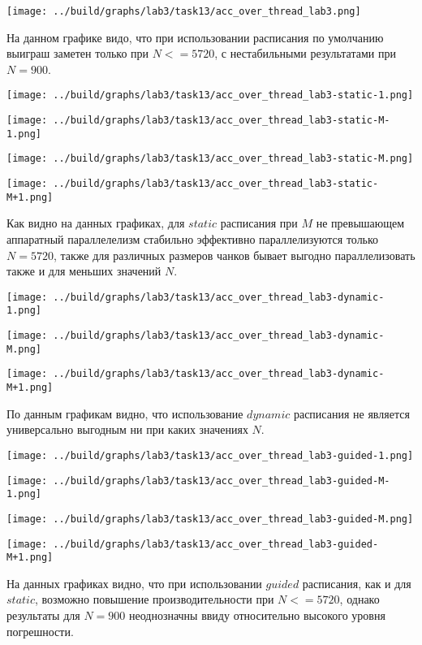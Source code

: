 \documentclass[14pt, a4paper, oneside, final]{extarticle}
\begin{document}
\texttt{[image: ../build/graphs/lab3/task13/acc\_over\_thread\_lab3.png]}

На данном графике видо, что при использовании расписания по умолчанию выиграш заметен только при $N<= 5720$, с нестабильными результатами при $N=900$.


\texttt{[image: ../build/graphs/lab3/task13/acc\_over\_thread\_lab3-static-1.png]}

\texttt{[image: ../build/graphs/lab3/task13/acc\_over\_thread\_lab3-static-M-1.png]}

\texttt{[image: ../build/graphs/lab3/task13/acc\_over\_thread\_lab3-static-M.png]}

\texttt{[image: ../build/graphs/lab3/task13/acc\_over\_thread\_lab3-static-M+1.png]}

Как видно на данных графиках, для $static$ расписания при $M$ не превышающем аппаратный параллелелизм стабильно эффективно параллелизуются только $N=5720$, также для различных размеров чанков бывает выгодно параллелизовать также и для меньших значений $N$.


\texttt{[image: ../build/graphs/lab3/task13/acc\_over\_thread\_lab3-dynamic-1.png]}

\texttt{[image: ../build/graphs/lab3/task13/acc\_over\_thread\_lab3-dynamic-M.png]}

\texttt{[image: ../build/graphs/lab3/task13/acc\_over\_thread\_lab3-dynamic-M+1.png]}

По данным графикам видно, что использование $dynamic$ расписания не является универсально выгодным ни при каких значениях $N$.

\texttt{[image: ../build/graphs/lab3/task13/acc\_over\_thread\_lab3-guided-1.png]}

\texttt{[image: ../build/graphs/lab3/task13/acc\_over\_thread\_lab3-guided-M-1.png]}

\texttt{[image: ../build/graphs/lab3/task13/acc\_over\_thread\_lab3-guided-M.png]}

\texttt{[image: ../build/graphs/lab3/task13/acc\_over\_thread\_lab3-guided-M+1.png]}

На данных графиках видно, что при использовании $guided$ расписания, как и для $static$, возможно повышение производительности при $N<=5720$, однако результаты для $N=900$ неоднозначны ввиду относительно высокого уровня погрешности.
\end{document}
